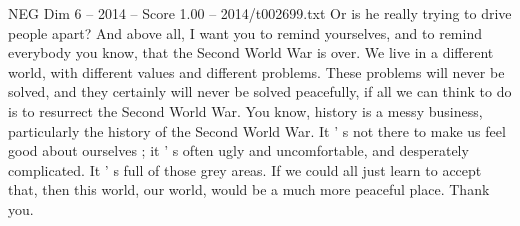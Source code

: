 \begin{textsample}{NEG Dim 6 – 2014 – Score 1.00 – 2014/t002699.txt}
Or is he really trying to drive people apart?
And above all, I want you to remind yourselves, and to remind everybody you know, that the Second World War is over.
We live in a different world, with different values and different problems.
These problems will never be solved, and they certainly will never be solved peacefully, if all we can think to do is to resurrect the Second World War.
You know, history is a messy business, particularly the history of the Second World War.
It ' s not there to make us feel good about ourselves ; it ' s often ugly and uncomfortable, and desperately complicated.
It ' s full of those grey areas.
If we could all just learn to accept that, then this world, our world, would be a much more peaceful place.
Thank you.

\end{textsample}
